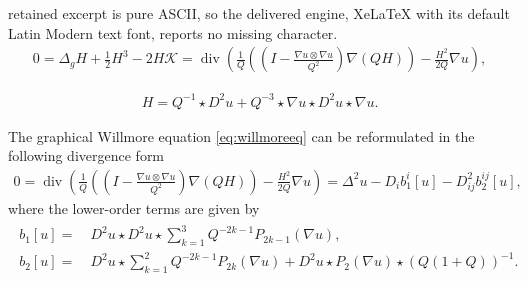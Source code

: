 \documentclass[10pt,a4paper]{amsart}
\newcommand{\Kk}{\mathcal {K}}
\renewcommand{\div}{\operatorname{div}}
\begin{document}
retained excerpt is pure ASCII, so the delivered engine, XeLaTeX with its default Latin Modern text font, reports no missing character.
\begin{align}
  0 =  \Delta_g H + \frac{1}{2}H^3-2H \Kk= \div \left( \frac{1}{Q} \left( \left(I-\frac{\nabla u \otimes \nabla u }{Q^2}
\right) \nabla (Q H) \right) - \frac{H^2 }{2Q} \nabla u\right), \label{eq:willmoreeq}
\end{align}

\begin{align}
    H=   Q^{-1}\star D^2u + Q^{-3}\star\nabla u\star D^2 u \star \nabla u. \label{eq:Hstar}
\end{align}

 \begin{lemma} \label{lem:willrewriten}
 The graphical Willmore equation \eqref{eq:willmoreeq} can be reformulated in the following divergence form
 \begin{align}
     0= \div \left( \frac{1}{Q} \left( \left(I-\frac{\nabla u \otimes \nabla u }{Q^2}
\right) \nabla (Q H) \right) - \frac{H^2 }{2Q} \nabla u\right)
= \Delta^2 u - D_{i} b^{i}_1[u] - D^2_{ij} b^{ij}_2[u],  \label{eq:Willmoreellipt}
\end{align}
where the lower-order terms are given by
\begin{align}
\begin{aligned}
b_1[u] =&\ D^2 u \star D^2 u \star \sum_{k=1}^3 Q^{-2k-1}P_{2k-1}(\nabla u),   \\
    b_2[u]=&\ D^2 u \star \sum_{k=1}^2 Q^{-2k-1}P_{2k}(\nabla u) + D^2 u \star P_2 (\nabla u) \star (Q(1+Q))^{-1}. 
\end{aligned}
    \label{eq:bi}
\end{align}
 \end{lemma}
\end{document}
